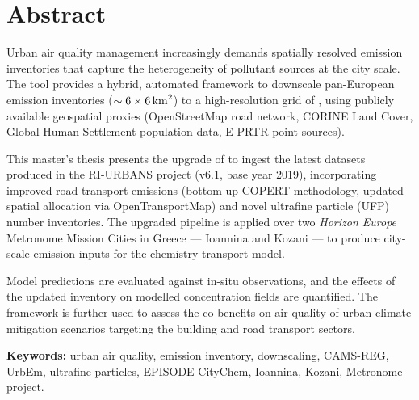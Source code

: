 
\chapter*{Abstract}


Urban air quality management increasingly demands spatially resolved emission
inventories that capture the heterogeneity of pollutant sources at the city
scale. The \urbem{} tool provides a hybrid, automated framework to downscale
pan-European \cams emission inventories ($\sim \qtyproduct[product-units=single]{6 x 6}{\km\squared}$)
to a high-resolution grid of , using publicly
available geospatial proxies (OpenStreetMap road network, CORINE Land Cover,
Global Human Settlement population data, E-PRTR point sources).

This master's thesis presents the upgrade of \urbem{} to ingest the latest
\cams{} datasets produced in the RI-URBANS project (v6.1, base year 2019),
incorporating improved road transport emissions (bottom-up COPERT methodology,
updated spatial allocation via OpenTransportMap) and novel ultrafine particle
(UFP) number inventories. The upgraded pipeline is applied over two \textit{Horizon
Europe} Metronome Mission Cities in Greece — Ioannina and Kozani — to produce
city-scale emission inputs for the \episode{} chemistry transport model.

Model predictions are evaluated against in-situ observations, and the effects
of the updated inventory on modelled concentration fields are quantified. The
framework is further used to assess the co-benefits on air quality of urban
climate mitigation scenarios targeting the building and road transport sectors.

\bigskip
\noindent\textbf{Keywords:} urban air quality, emission inventory, downscaling,
CAMS-REG, UrbEm, ultrafine particles, EPISODE-CityChem, Ioannina, Kozani,
Metronome project.
